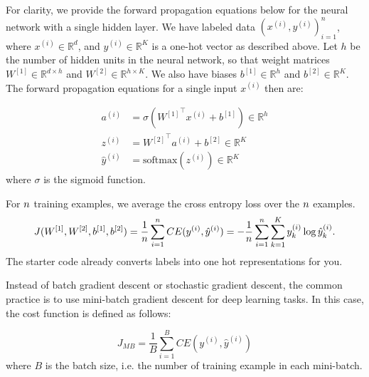 For clarity, we provide the forward propagation equations below for the neural network with a single hidden layer. We have labeled data $(x^{(i)}, y^{(i)})_{i=1}^n$, where $x^{(i)} \in \mathbb{R}^d$, and $y^{(i)} \in \mathbb{R}^K$ is a one-hot vector as described above. Let $h$ be the number of hidden units in the neural network, so that weight matrices $W^{[1]} \in \mathbb{R}^{d \times h}$ and $W^{[2]} \in \mathbb{R}^{h \times K}$. We also have biases $b^{[1]} \in \mathbb{R}^h$ and $b^{[2]} \in \mathbb{R}^K$. The forward propagation equations for a single input $x^{(i)}$ then are:

\begin{align*}
  a^{(i)} &= \sigma \left( {W^{[1]}}^\top x^{(i)}  + b^{[1]} \right)  \in \mathbb{R}^h \\
  z^{(i) }&= {W^{[2]}}^\top a^{(i)} + b^{[2]} \in \mathbb{R}^K \\
  \hat{y}^{(i)} &=  \mathrm{softmax}(z^{(i)}) \in \mathbb{R}^K
\end{align*}
where $\sigma$ is the sigmoid function. 

For ${n}$ training examples, we average the cross entropy loss over the ${n}$ examples.
  \begin{equation*}
  J(W^{[1]},W^{[2]},b^{[1]},b^{[2]}) = \frac{1}{{n}}\sum_{i=1}^{n} CE(y^{(i)}, \hat{y}^{(i)}) = - \frac{1}{{n}}\sum_{i=1}^{n} \sum_{k=1}^K y_k^{(i)} \log \hat{y}_k^{(i)}.
  \end{equation*}
The starter code already converts labels into one hot representations for you.

Instead of batch gradient descent or stochastic gradient descent, the common practice
is to use mini-batch gradient descent for deep learning tasks. In this case, the
cost function is defined as follows:

  \begin{equation*}
  J_{MB} = \frac{1}{B}\sum_{i=1}^{B}CE(y^{(i)}, \hat{y}^{(i)})
  \end{equation*}
where $B$ is the batch size, i.e. the number of training example in each mini-batch. 

\begin{enumerate}
  

\ifnum{} {
  
} \fi

  

\ifnum{} {
  
} \fi

  

\ifnum{} {
  
} \fi


  
\ifnum{} {
  
} \fi

 \end{enumerate}


